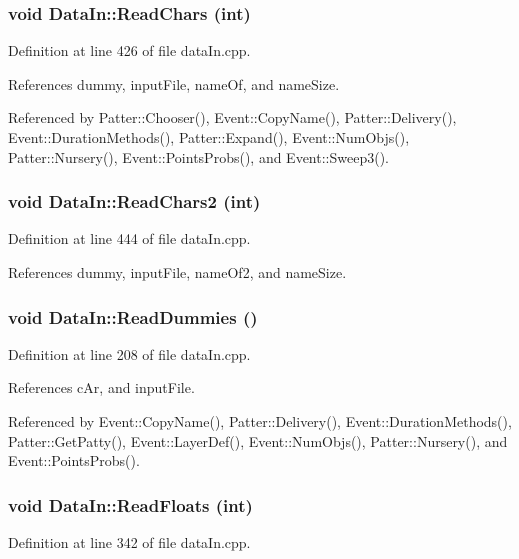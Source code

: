 \subsubsection{\setlength{\rightskip}{0pt plus 5cm}void Data\-In::Read\-Chars (int)}\label{classDataIn_a16}




Definition at line 426 of file data\-In.cpp.

References dummy, input\-File, name\-Of, and name\-Size.

Referenced by Patter::Chooser(), Event::Copy\-Name(), Patter::Delivery(), Event::Duration\-Methods(), Patter::Expand(), Event::Num\-Objs(), Patter::Nursery(), Event::Points\-Probs(), and Event::Sweep3().
\subsubsection{\setlength{\rightskip}{0pt plus 5cm}void Data\-In::Read\-Chars2 (int)}\label{classDataIn_a17}




Definition at line 444 of file data\-In.cpp.

References dummy, input\-File, name\-Of2, and name\-Size.
\subsubsection{\setlength{\rightskip}{0pt plus 5cm}void Data\-In::Read\-Dummies ()}\label{classDataIn_a6}




Definition at line 208 of file data\-In.cpp.

References c\-Ar, and input\-File.

Referenced by Event::Copy\-Name(), Patter::Delivery(), Event::Duration\-Methods(), Patter::Get\-Patty(), Event::Layer\-Def(), Event::Num\-Objs(), Patter::Nursery(), and Event::Points\-Probs().
\subsubsection{\setlength{\rightskip}{0pt plus 5cm}void Data\-In::Read\-Floats (int)}\label{classDataIn_a13}




Definition at line 342 of file data\-In.cpp.

